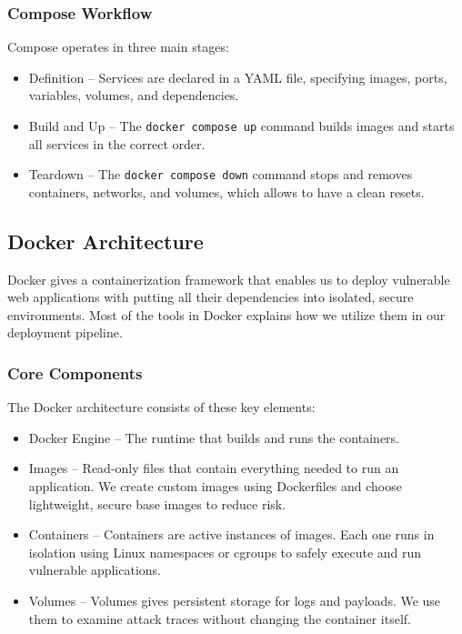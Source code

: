 \documentclass[12pt]{article}
\begin{document}
\subsubsection{Compose Workflow}
Compose operates in three main stages:
\begin{itemize}
    \item{Definition} – Services are declared in a YAML file, specifying images, ports, variables, volumes, and dependencies.
    \item{Build and Up} – The \texttt{docker compose up} command builds images and starts all services in the correct order.
    \item{Teardown} – The \texttt{docker compose down} command stops and removes containers, networks, and volumes, which allows to have a clean resets.
\end{itemize}

\subsection{Docker Architecture}
Docker gives a containerization framework that enables us to deploy vulnerable web applications with putting all their dependencies into isolated, secure environments. Most of the tools in Docker explains how we utilize them in our deployment pipeline.

\subsubsection{Core Components}
The Docker architecture consists of these key elements:
  \begin{itemize}
    \item {Docker Engine} – The runtime that builds and runs the containers.
    \item {Images} – Read-only files that contain everything needed to run an application. We create custom images using Dockerfiles and choose lightweight, secure base images to reduce risk.
    \item {Containers} – Containers are active instances of images. Each one runs in isolation using Linux namespaces or cgroups to safely execute and run vulnerable applications.
    \item {Volumes} – Volumes gives persistent storage for logs and payloads. We use them to examine attack traces without changing the container itself.
    \end{itemize}
\end{document}

